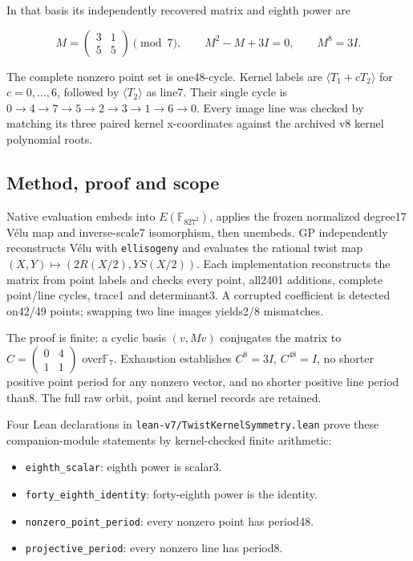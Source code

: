 \documentclass[
  10pt,
]{article}
\providecommand{\tightlist}{%
  \setlength{\itemsep}{0pt}\setlength{\parskip}{0pt}}
\begin{document}
In that basis its independently recovered matrix and eighth power are

\[M=\begin{pmatrix}3&1\\5&5\end{pmatrix}\pmod7,
\qquad M^2-M+3I=0,\qquad M^8=3I.\]

The complete nonzero point set is one48-cycle. Kernel labels are
\(\langle T_1+cT_2\rangle\) for \(c=0,\ldots,6\), followed by
\(\langle T_2\rangle\) as line7. Their single cycle is
\(0\to4\to7\to5\to2\to3\to1\to6\to0\). Every image line was checked by
matching its three paired kernel x-coordinates against the archived v8
kernel polynomial roots.

\subsection{Method, proof and scope}\label{method-proof-and-scope}

Native evaluation embeds into \(E(\mathbb F_{827^2})\), applies the
frozen normalized degree17 Vélu map and inverse-scale7 isomorphism, then
unembeds. GP independently reconstructs Vélu with \texttt{ellisogeny}
and evaluates the rational twist map \((X,Y)\mapsto(2R(X/2),Y S(X/2))\).
Each implementation reconstructs the matrix from point labels and checks
every point, all2401 additions, complete point/line cycles, trace1 and
determinant3. A corrupted coefficient is detected on42/49 points;
swapping two line images yields2/8 mismatches.

The proof is finite: a cyclic basis \((v,Mv)\) conjugates the matrix to
\(C=\left(\begin{smallmatrix}0&4\\1&1\end{smallmatrix}\right)\)
over\(\mathbb F_7\). Exhaustion establishes \(C^8=3I\), \(C^{48}=I\), no
shorter positive point period for any nonzero vector, and no shorter
positive line period than8. The full raw orbit, point and kernel records
are retained.

Four Lean declarations in \texttt{lean-v7/TwistKernelSymmetry.lean}
prove these companion-module statements by kernel-checked finite
arithmetic:

\begin{itemize}
\tightlist
\item
  \texttt{eighth\_scalar}: eighth power is scalar3.
\item
  \texttt{forty\_eighth\_identity}: forty-eighth power is the identity.
\item
  \texttt{nonzero\_point\_period}: every nonzero point has period48.
\item
  \texttt{projective\_period}: every nonzero line has period8.
\end{itemize}
\end{document}
